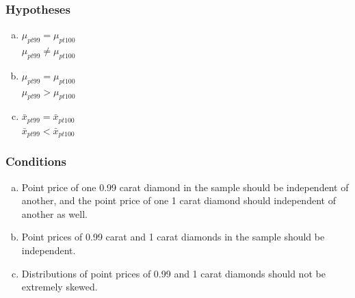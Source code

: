 
\begin{frame}
\frametitle{Hypotheses}


\begin{enumerate}[(a)]

\item  {} $\mu_{pt99} = \mu_{pt100}$ \\
 $\mu_{pt99} \ne \mu_{pt100}$

\item  {} $\mu_{pt99} = \mu_{pt100}$ \\
 $\mu_{pt99} > \mu_{pt100}$


\item  {} $\bar{x}_{pt99} = \bar{x}_{pt100}$ \\
 $\bar{x}_{pt99} < \bar{x}_{pt100}$

\end{enumerate}

\end{frame}


\begin{frame}
\frametitle{Conditions}


\begin{enumerate}[(a)]

\item Point price of one 0.99 carat diamond in the sample should be independent of another, and the point price of one 1 carat diamond should independent of another as well.

\item Point prices of 0.99 carat and 1 carat diamonds in the sample should be independent.

\item Distributions of point prices of 0.99 and 1 carat diamonds should not be extremely skewed.


\end{enumerate}

\end{frame}


